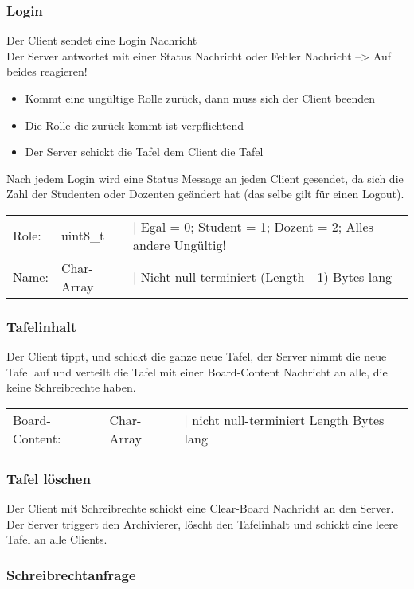 \subsubsection{Login}
Der Client sendet eine Login Nachricht \\
Der Server antwortet mit einer Status Nachricht oder Fehler Nachricht --> Auf beides reagieren!
\begin{itemize}
	\item Kommt eine ungültige Rolle zurück, dann muss sich der Client beenden
	\item Die Rolle die zurück kommt ist verpflichtend
	\item Der Server schickt die Tafel dem Client die Tafel
\end{itemize}
Nach jedem Login wird eine Status Message an jeden Client gesendet, da sich die Zahl der Studenten
oder Dozenten geändert hat (das selbe gilt für einen Logout).

\begin{tabular}{lll}
Role: & uint8\_t & | Egal = 0; Student =  1; Dozent = 2; Alles andere Ungültig! \\
Name: & Char-Array & | Nicht null-terminiert (Length - 1) Bytes lang
\end{tabular}

\subsubsection{Tafelinhalt}
Der Client tippt, und schickt die ganze neue Tafel, der Server nimmt die neue Tafel auf und verteilt 
die Tafel mit einer Board-Content Nachricht an alle, die keine Schreibrechte haben.

\begin{tabular}{lll}
Board-Content: & Char-Array & | nicht null-terminiert Length Bytes lang
\end{tabular}

\subsubsection{Tafel löschen}
Der Client mit Schreibrechte schickt eine Clear-Board Nachricht an den Server. Der Server triggert 
den Archivierer, löscht den Tafelinhalt und schickt eine leere Tafel an alle Clients. 


\subsubsection{Schreibrechtanfrage}
